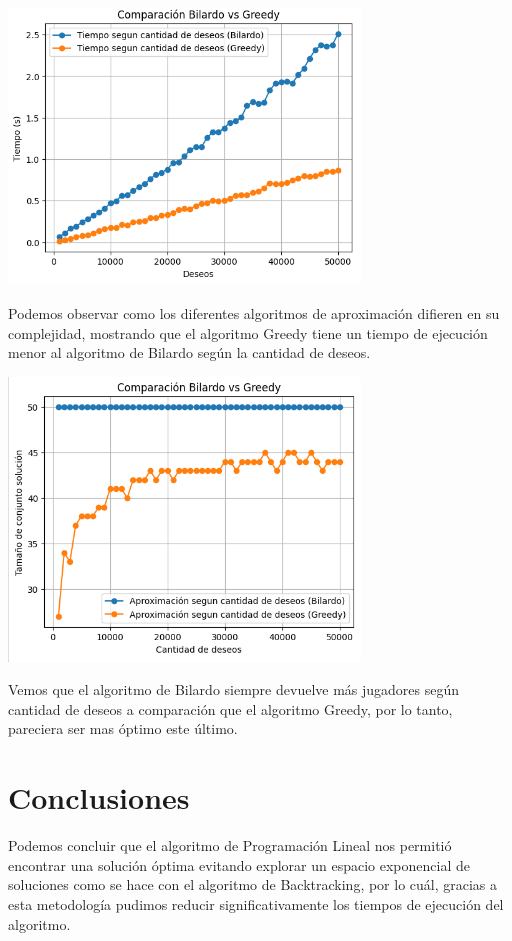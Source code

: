 \documentclass{estilo}
\begin{document}
\begin{center}
\includegraphics[width=0.7\textwidth]{img/bilardo_vs_greedy_1.png}

Podemos observar como los diferentes algoritmos de aproximación difieren en su complejidad, mostrando que el algoritmo Greedy tiene un tiempo de ejecución menor al algoritmo de Bilardo según la cantidad de deseos.
\end{center}

\begin{center}
\includegraphics[width=0.7\textwidth]{img/bilardo_vs_greedy_2.png}

Vemos que el algoritmo de Bilardo siempre devuelve más jugadores según cantidad de deseos a comparación que el algoritmo Greedy, por lo tanto, pareciera ser mas óptimo este último.
\end{center}

\section{Conclusiones}

Podemos concluir que el algoritmo de Programación Lineal nos permitió encontrar una solución óptima evitando explorar un espacio exponencial de soluciones como se hace con el algoritmo de Backtracking, por lo cuál, gracias a esta metodología pudimos reducir significativamente los tiempos de ejecución del algoritmo.
\end{document}
